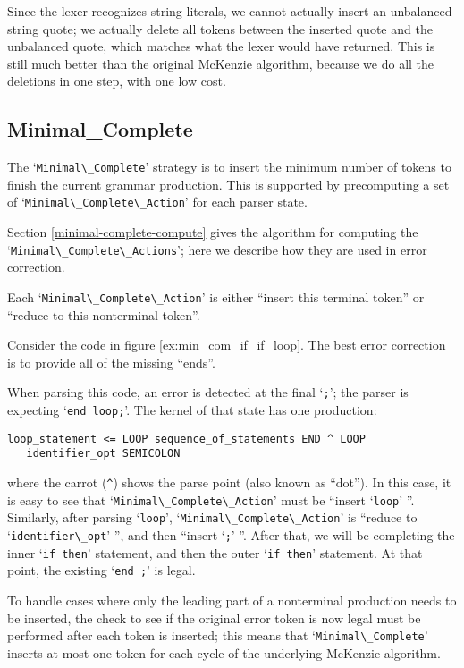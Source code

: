 \documentclass{article}
\newcommand{\code}[1]{`\lstinline|#1|'}
\begin{document}
Since the lexer recognizes string literals, we cannot actually insert
an unbalanced string quote; we actually delete all tokens between the
inserted quote and the unbalanced quote, which matches what the lexer
would have returned. This is still much better than the original
McKenzie algorithm, because we do all the deletions in one step, with
one low cost.

\subsection{Minimal\_Complete}
The \code{Minimal\_Complete} strategy is to insert the minimum number
of tokens to finish the current grammar production. This is supported
by precomputing a set of \code{Minimal\_Complete\_Action} for each
parser state.

Section \ref{minimal-complete-compute} gives the algorithm for
computing the\\ \code{Minimal\_Complete\_Actions}; here we describe how
they are used in error correction.

Each \code{Minimal\_Complete\_Action} is either ``insert this terminal
token'' or ``reduce to this nonterminal token''.

Consider the code in figure \ref{ex:min_com_if_if_loop}. The best error
correction is to provide all of the missing ``ends''.

When parsing this code, an error is detected at the final \code{;};
the parser is expecting \code{end loop;}. The kernel of that state has
one production:
\begin{verbatim}
loop_statement <= LOOP sequence_of_statements END ^ LOOP
   identifier_opt SEMICOLON
\end{verbatim}
where the carrot (\verb|^|) shows the parse point (also known as
``dot''). In this case, it is easy to see that
\code{Minimal\_Complete\_Action} must be ``insert \code{loop} ''.
Similarly, after parsing \code{loop}, \code{Minimal\_Complete\_Action}
is ``reduce to \code{identifier\_opt} '', and then ``insert \code{;}
''. After that, we will be completing the inner \code{if then}
statement, and then the outer \code{if then} statement. At that point,
the existing \code{end ;} is legal.

To handle cases where only the leading part of a nonterminal
production needs to be inserted, the check to see if the original
error token is now legal must be performed after each token is
inserted; this means that \code{Minimal\_Complete} inserts at most one
token for each cycle of the underlying McKenzie algorithm.
\end{document}
